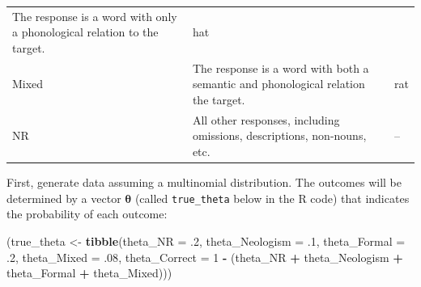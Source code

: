\documentclass[12pt,]{krantz}
\newenvironment{Shaded}{\begin{snugshade}}{\end{snugshade}}
\newcommand{\KeywordTok}[1]{\textcolor[rgb]{0.13,0.29,0.53}{\textbf{#1}}}
\newcommand{\DataTypeTok}[1]{\textcolor[rgb]{0.13,0.29,0.53}{#1}}
\newcommand{\DecValTok}[1]{\textcolor[rgb]{0.00,0.00,0.81}{#1}}
\newcommand{\FloatTok}[1]{\textcolor[rgb]{0.00,0.00,0.81}{#1}}
\newcommand{\StringTok}[1]{\textcolor[rgb]{0.31,0.60,0.02}{#1}}
\newcommand{\OperatorTok}[1]{\textcolor[rgb]{0.81,0.36,0.00}{\textbf{#1}}}
\newcommand{\NormalTok}[1]{#1}
\theoremstyle{definition}
\theoremstyle{definition}
\theoremstyle{definition}
\theoremstyle{remark}
\begin{document}
\begin{longtable}[]{@{}lll@{}}
\begin{minipage}[t]{0.70\columnwidth}
The response is a word with only a phonological relation to the
target.\strut
\end{minipage} & \begin{minipage}[t]{0.07\columnwidth}\raggedright\strut
hat\strut
\end{minipage}\tabularnewline
\begin{minipage}[t]{0.14\columnwidth}\raggedright\strut
Mixed\strut
\end{minipage} & \begin{minipage}[t]{0.70\columnwidth}\raggedright\strut
The response is a word with both a semantic and phonological relation
the target.\strut
\end{minipage} & \begin{minipage}[t]{0.07\columnwidth}\raggedright\strut
rat\strut
\end{minipage}\tabularnewline
\begin{minipage}[t]{0.14\columnwidth}\raggedright\strut
NR\strut
\end{minipage} & \begin{minipage}[t]{0.70\columnwidth}\raggedright\strut
All other responses, including omissions, descriptions, non-nouns,
etc.\strut
\end{minipage} & \begin{minipage}[t]{0.07\columnwidth}\raggedright\strut
--\strut
\end{minipage}\tabularnewline
\bottomrule
\end{longtable}

First, generate data assuming a multinomial distribution. The outcomes
will be determined by a vector \(\boldsymbol{\theta}\) (called
\texttt{true\_theta} below in the R code) that indicates the probability
of each outcome:

\begin{Shaded}
\begin{Highlighting}[]
\NormalTok{(true_theta <-}\StringTok{ }\KeywordTok{tibble}\NormalTok{(}\DataTypeTok{theta_NR =} \FloatTok{.2}\NormalTok{, }
                     \DataTypeTok{theta_Neologism =} \FloatTok{.1}\NormalTok{,}
                     \DataTypeTok{theta_Formal =} \FloatTok{.2}\NormalTok{,}
                     \DataTypeTok{theta_Mixed =} \FloatTok{.08}\NormalTok{,}
                     \DataTypeTok{theta_Correct =}  \DecValTok{1} \OperatorTok{-}
\StringTok{                }\NormalTok{(theta_NR }\OperatorTok{+}\StringTok{ }\NormalTok{theta_Neologism }\OperatorTok{+}\StringTok{ }\NormalTok{theta_Formal }\OperatorTok{+}\StringTok{ }\NormalTok{theta_Mixed)))}
\end{Highlighting}
\end{Shaded}
\end{document}
